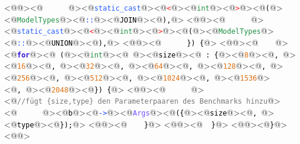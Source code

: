 <@\textcolor[HTML]{000000}{\texttt{}}@><@\textcolor[HTML]{000000}{\texttt{\ \ \ \ \ \ }}@><@\textcolor[HTML]{255CFF}{\texttt{static\_cast}}@><@\textcolor[HTML]{FF1010}{\texttt{<}}@><@\textcolor[HTML]{1F8F42}{\texttt{int}}@><@\textcolor[HTML]{FF1010}{\texttt{>}}@><@\textcolor[HTML]{000000}{\texttt{(}}@><@\textcolor[HTML]{1F8F42}{\texttt{ModelTypes}}@><@\textcolor[HTML]{1041FF}{\texttt{::}}@><@\textcolor[HTML]{000000}{\texttt{JOIN}}@><@\textcolor[HTML]{000000}{\texttt{),}}@>
<@\textcolor[HTML]{000000}{\texttt{}}@><@\textcolor[HTML]{000000}{\texttt{\ \ \ \ \ \ }}@><@\textcolor[HTML]{255CFF}{\texttt{static\_cast}}@><@\textcolor[HTML]{FF1010}{\texttt{<}}@><@\textcolor[HTML]{1F8F42}{\texttt{int}}@><@\textcolor[HTML]{FF1010}{\texttt{>}}@><@\textcolor[HTML]{000000}{\texttt{(}}@><@\textcolor[HTML]{1F8F42}{\texttt{ModelTypes}}@><@\textcolor[HTML]{1041FF}{\texttt{::}}@><@\textcolor[HTML]{000000}{\texttt{UNION}}@><@\textcolor[HTML]{000000}{\texttt{),}}@>
<@\textcolor[HTML]{000000}{\texttt{}}@><@\textcolor[HTML]{000000}{\texttt{\ \ \ \ \ \ \})\ \{}}@>
<@\textcolor[HTML]{000000}{\texttt{}}@><@\textcolor[HTML]{000000}{\texttt{\ \ \ \ }}@><@\textcolor[HTML]{3010CF}{\textbf{\texttt{for}}}@><@\textcolor[HTML]{000000}{\texttt{\ (}}@><@\textcolor[HTML]{1F8F42}{\texttt{int}}@><@\textcolor[HTML]{000000}{\texttt{\ }}@><@\textcolor[HTML]{000000}{\texttt{size}}@><@\textcolor[HTML]{000000}{\texttt{\ :\ \{}}@><@\textcolor[HTML]{DE6F10}{\texttt{8}}@><@\textcolor[HTML]{000000}{\texttt{,\ }}@><@\textcolor[HTML]{DE6F10}{\texttt{16}}@><@\textcolor[HTML]{000000}{\texttt{,\ }}@><@\textcolor[HTML]{DE6F10}{\texttt{32}}@><@\textcolor[HTML]{000000}{\texttt{,\ }}@><@\textcolor[HTML]{DE6F10}{\texttt{64}}@><@\textcolor[HTML]{000000}{\texttt{,\ }}@><@\textcolor[HTML]{DE6F10}{\texttt{128}}@><@\textcolor[HTML]{000000}{\texttt{,\ }}@><@\textcolor[HTML]{DE6F10}{\texttt{256}}@><@\textcolor[HTML]{000000}{\texttt{,\ }}@><@\textcolor[HTML]{DE6F10}{\texttt{512}}@><@\textcolor[HTML]{000000}{\texttt{,\ }}@><@\textcolor[HTML]{DE6F10}{\texttt{1024}}@><@\textcolor[HTML]{000000}{\texttt{,\ }}@><@\textcolor[HTML]{DE6F10}{\texttt{1536}}@><@\textcolor[HTML]{000000}{\texttt{,\ }}@><@\textcolor[HTML]{DE6F10}{\texttt{2048}}@><@\textcolor[HTML]{000000}{\texttt{\})\ \{}}@>
<@\textcolor[HTML]{000000}{\texttt{}}@><@\textcolor[HTML]{000000}{\texttt{\ \ \ \ \ \ }}@><@\textcolor[HTML]{777777}{\texttt{//fügt\ \{size,type\}\ den\ Parameterpaaren\ des\ Benchmarks\ hinzu}}@>
<@\textcolor[HTML]{000000}{\texttt{\ \ \ \ \ \ }}@><@\textcolor[HTML]{000000}{\texttt{b}}@><@\textcolor[HTML]{1041FF}{\texttt{->}}@><@\textcolor[HTML]{724BFF}{\texttt{Args}}@><@\textcolor[HTML]{000000}{\texttt{(\{}}@><@\textcolor[HTML]{000000}{\texttt{size}}@><@\textcolor[HTML]{000000}{\texttt{,\ }}@><@\textcolor[HTML]{000000}{\texttt{type}}@><@\textcolor[HTML]{000000}{\texttt{\});}}@>
<@\textcolor[HTML]{000000}{\texttt{}}@><@\textcolor[HTML]{000000}{\texttt{\ \ \ \ \}}}@>
<@\textcolor[HTML]{000000}{\texttt{}}@><@\textcolor[HTML]{000000}{\texttt{\ \ \}}}@>
<@\textcolor[HTML]{000000}{\texttt{}}@><@\textcolor[HTML]{000000}{\texttt{\}}}@>
<@\textcolor[HTML]{000000}{\texttt{}}@>